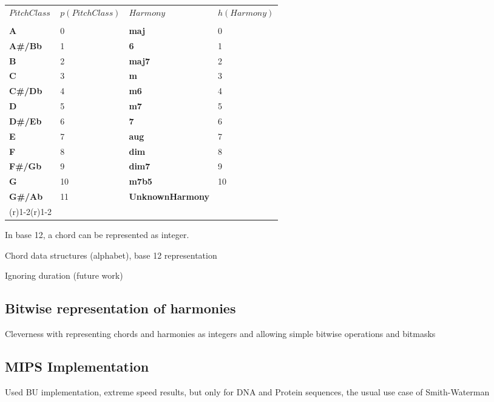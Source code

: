 \begin{tabular}{ll}
\toprule
$PitchClass$ & $p(PitchClass)$ & $Harmony$ & $h(Harmony)$ \\
\cmidrule(r){1-2} \cmidrule(r){1-2} \\
\textbf{A}     & 0  & \textbf{maj} & 0 \\
\textbf{A#/Bb} & 1  & \textbf{6} & 1 \\
\textbf{B}     & 2  & \textbf{maj7} & 2 \\
\textbf{C}     & 3  & \textbf{m} & 3 \\
\textbf{C#/Db} & 4  & \textbf{m6} & 4 \\
\textbf{D}     & 5  & \textbf{m7} & 5 \\
\textbf{D#/Eb} & 6  & \textbf{7} & 6 \\
\textbf{E}     & 7  & \textbf{aug} & 7 \\
\textbf{F}     & 8  & \textbf{dim} & 8 \\
\textbf{F#/Gb} & 9  & \textbf{dim7} & 9 \\
\textbf{G}     & 10 & \textbf{m7b5} & 10 \\
\textbf{G#/Ab} & 11 & \textbf{UnknownHarmony} & \\
\cbottomrule(r){1-2}\cbottomrule(r){1-2}
\end{tabular}

In base 12, a chord can be represented as integer.

\item Chord data structures (alphabet), base 12 representation

\item Ignoring duration (future work)

\subsection{Bitwise representation of harmonies}

\item Cleverness with representing chords and harmonies as integers and allowing simple bitwise operations and bitmasks

\subsection{MIPS Implementation}

\item Used BU implementation, extreme speed results, but only for DNA and Protein sequences, the usual use case of Smith-Waterman

